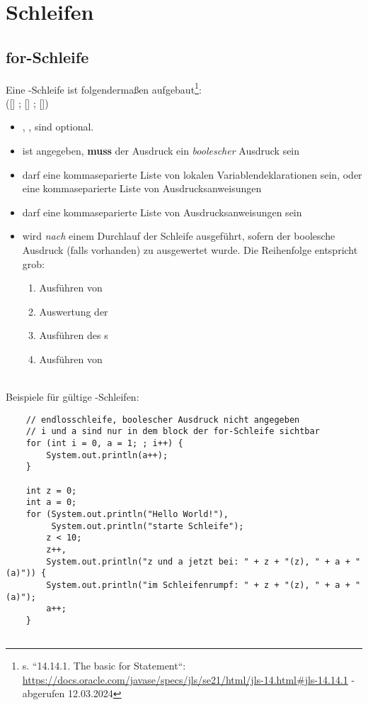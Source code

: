 \section{Schleifen}

\subsection{for-Schleife}

Eine -Schleife ist folgendermaßen aufgebaut\footnote{
s. ``14.14.1. The basic for Statement``: \url{https://docs.oracle.com/javase/specs/jls/se21/html/jls-14.html#jls-14.14.1} - abgerufen 12.03.2024
}:\\

\noindent
{} ([] ; [] ; []) \\

\begin{itemize}
    \item {}, ,  sind optional.
    \item ist  angegeben, \textbf{muss} der Ausdruck ein \textit{boolescher} Ausdruck sein
    \item {} darf eine kommaseparierte Liste von lokalen Variablendeklarationen sein, oder eine kommaseparierte Liste von Ausdrucksanweisungen
    \item {} darf eine kommaseparierte Liste von Ausdrucksanweisungen sein
    \item {} wird \textit{nach} einem Durchlauf der Schleife ausgeführt, sofern der boolesche Ausdruck (falls vorhanden) zu  ausgewertet wurde.
    Die Reihenfolge entspricht grob:
    \begin{enumerate}
        \item Ausführen von 
        \item Auswertung der 
        \item Ausführen des s
        \item Ausführen von 
    \end{enumerate}

\end{itemize}\\

\noindent
Beispiele für gültige -Schleifen:

\begin{verbatim}
    // endlosschleife, boolescher Ausdruck nicht angegeben
    // i und a sind nur in dem block der for-Schleife sichtbar
    for (int i = 0, a = 1; ; i++) {
        System.out.println(a++);
    }

    int z = 0;
    int a = 0;
    for (System.out.println("Hello World!"),
         System.out.println("starte Schleife");
        z < 10;
        z++,
        System.out.println("z und a jetzt bei: " + z + "(z), " + a + "(a)")) {
        System.out.println("im Schleifenrumpf: " + z + "(z), " + a + "(a)");
        a++;
    }


\end{verbatim}


